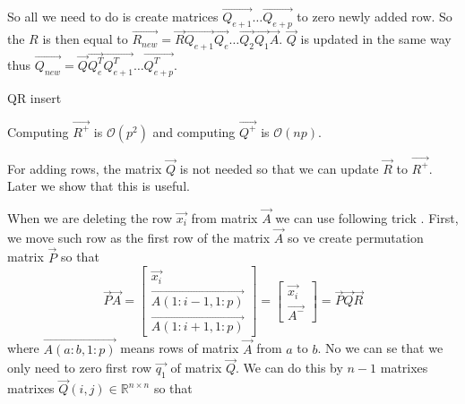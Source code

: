 So all we need to do is create matrices $\vec{Q_{e+1}}\ldots\vec{Q_{e+p}}$ to zero newly added row.
So the $R$ is then equal to $\vec{R_{new}} = \vec{R}\vec{Q_{e+1}}\vec{Q_e}\ldots\vec{Q_2}\vec{Q_1}\vec{A}$. 
$\vec{Q}$ is updated in the same way thus $\vec{Q_{new}} = \vec{Q}\vec{Q_e^T}\vec{Q_{e+1}^T}\ldots\vec{Q_{e+p}^T}$.

\begin{algorithm}[H]
    \label{addingrowqr}
      \caption{QR insert}

    \;
\end{algorithm}

Computing $\vec{R^{+}}$ is $\mathcal{O}(p^2)$ and computing $\vec{Q^{+}}$ is $\mathcal{O}(np)$.

\begin{note} \label{qnotrequired}
    For adding rows, the matrix $\vec{Q}$ is not needed so that we can update $\vec{R}$ to $\vec{R^{+}}$. Later we show that this is useful. 
\end{note}




When we are deleting the row $\vec{x_i}$ from matrix $\vec{A}$ we can use following trick 
\cite{hammarling2008updatingqr}. First, we move such row as the first row of the matrix $\vec{A}$ so ve create permutation matrix $\vec{P}$ so that 
\begin{equation}
    \vec{P}\vec{A} = \begin{bmatrix}
        \vec{x_i} \\
        \vec{A(1:i-1 , 1:p)} \\
        \vec{A(1:i+1 , 1:p)} 
    \end{bmatrix}
    = 
    \begin{bmatrix}
        \vec{x_i} \\
        \vec{A^{-}}
    \end{bmatrix}
    = \vec{P}\vec{Q}\vec{R}
\end{equation} 
where $\vec{A(a:b , 1:p)} $ means rows of matrix $\vec{A}$ from $a$ to $b$.
No we can se that we only need to zero first row $\vec{q_1}$ of matrix $\vec{Q}$. We can do this by $n-1$ matrixes matrixes $\vec{Q}(i,j) \in \mathbb{R}^{n \times n}$ so that

